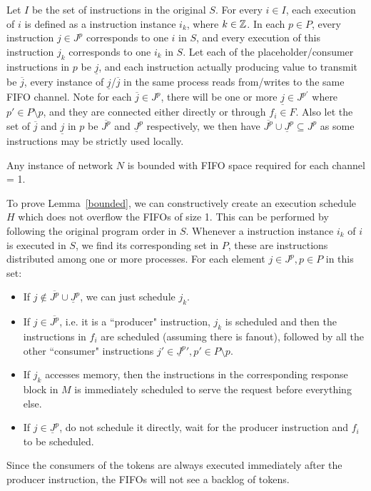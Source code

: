 \begin{definition}
Let $I$ be the set of instructions in the original $S$. For every $i \in I$, each
execution of $i$ is defined as a instruction instance $i_k$, where $k \in \Bbb{Z}$.
 In each $p \in P$, 
every instruction $j \in J^p$ corresponds to one $i$ in $S$, and every execution of this instruction $j_k$ corresponds to one $i_k$ in $S$. Let 
each of the placeholder/consumer instructions in $p$ be $\underline{j}$, and each instruction actually producing value to transmit be $\overline{j}$, every instance
of $\underline{j}$/$\overline{j}$ in the same process reads from/writes to the same FIFO channel. Note for each $\overline{j} \in J^p$,
there will be one or more  $\underline{j} \in J^{p'}$ where $p' \in P\setminus p$, and they are connected either directly or through $f_i \in F$. Also let the set of $\overline{j}$
 and $\underline{j}$ in $p$ be $\overline{J^p}$ and $\underline{J}^p$ respectively,
 we then have $\overline{J^p} \cup \underline{J}^p \subseteq J^p$ as some instructions may be strictly used locally.
\end{definition}



\begin{lemma}
\label{bounded}
Any instance of network $N$ is bounded with FIFO space required for each channel = 1.
\end{lemma}




To prove Lemma~\ref{bounded}, we can constructively create an execution schedule $H$
which does not overflow the FIFOs of size 1. This can be performed by following the original program order in $S$. 
Whenever a instruction instance $i_k$  of $i$ is executed in $S$, we find its corresponding set in $P$, these are instructions distributed among one or more processes.
For each element $j \in J^p, p \in P$ in this set:
\begin{itemize}
    \item If $j \not\in \overline{J^p} \cup \underline{J}^p$, we can just schedule $j_k$.
    \item If $j \in \overline{J^p}$, i.e. it is a ``producer" instruction, $j_k$ is scheduled and then the instructions in $f_i$ are scheduled (assuming there is fanout), followed by all the other ``consumer" instructions $j' \in \underline{J}^p', p' \in P\setminus p$.
    

    \item If $j_k$ accesses memory, then the instructions in the corresponding response block in $M$ is immediately scheduled to serve the request before everything else.
    \item If $j \in \underline{J}^p$, do not schedule it directly, wait for the producer instruction and $f_i$ to be scheduled.
\end{itemize}
Since the consumers of the tokens are always executed immediately after the producer instruction, the FIFOs will not see a backlog of tokens.

